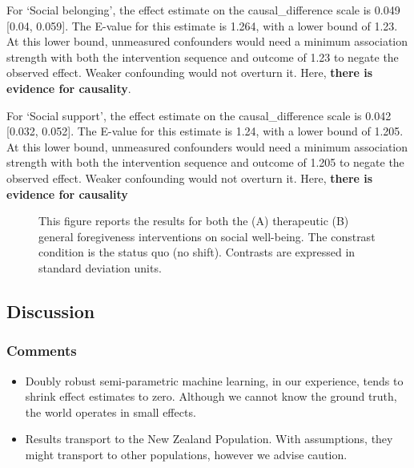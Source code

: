\documentclass[
  single column]{article}
\begin{document}
For `Social belonging', the effect estimate on the causal\_difference
scale is 0.049 {[}0.04, 0.059{]}. The E-value for this estimate is
1.264, with a lower bound of 1.23. At this lower bound, unmeasured
confounders would need a minimum association strength with both the
intervention sequence and outcome of 1.23 to negate the observed effect.
Weaker confounding would not overturn it. Here, \textbf{there is
evidence for causality}.

For `Social support', the effect estimate on the causal\_difference
scale is 0.042 {[}0.032, 0.052{]}. The E-value for this estimate is
1.24, with a lower bound of 1.205. At this lower bound, unmeasured
confounders would need a minimum association strength with both the
intervention sequence and outcome of 1.205 to negate the observed
effect. Weaker confounding would not overturn it. Here, \textbf{there is
evidence for causality}

\begin{figure}


\caption{\label{fig-5_1}This figure reports the results for both the (A)
therapeutic (B) general foregiveness interventions on social well-being.
The constrast condition is the status quo (no shift). Contrasts are
expressed in standard deviation units.}

\end{figure}%

\newpage{}

\subsection{Discussion}\label{discussion}

\subsubsection{Comments}\label{comments}

\begin{itemize}
\item
  Doubly robust semi-parametric machine learning, in our experience,
  tends to shrink effect estimates to zero. Although we cannot know the
  ground truth, the world operates in small effects.
\item
  Results transport to the New Zealand Population. With assumptions,
  they might transport to other populations, however we advise caution.
\end{itemize}
\end{document}
